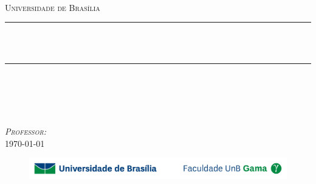 \begin{titlepage}

\newcommand{\HRule}{\rule{\linewidth}{0.5mm}} %

\center %

\textsc{\LARGE \disciplina{}}\\[1.5cm] 
\textsc{\Large Universidade de Bras\' ilia}\\[0.5cm]

\vspace{3cm}


\HRule \\[0.4cm]
{ \huge \bfseries \thetitle }\\[0.4cm] %
\HRule \\[1.5cm]
 

\vspace{2cm}


\textsc{\LARGE \theauthor }\\[0.8cm]
\textsc{\LARGE \matricula{} }\\[1.5cm]

\vspace{0.5cm}

\textsc{\Large \textit{Professor: } \professor{}}\\[1cm]


{\large \today}\\[2cm] %

\begin{figure}[!b]
    \centering
    \includegraphics[width=\linewidth]{fixos/logofgaunb.jpg}
\end{figure}


\vfill %

\end{titlepage}
